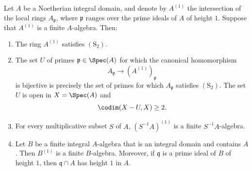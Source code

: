 \begin{proposition}[5.10.17]
\label{IV.5.10.17}
Let $A$ be a Noetherian integral domain, and denote by $A^{(1)}$
the intersection of the local rings $A_{\mathfrak p}$, where
$\mathfrak p$ ranges over the prime ideals of $A$ of height $1$.
Suppose that $A^{(1)}$ is a finite $A$-algebra.  Then:
\begin{enumerate}[{\rm(i)}]
  \item The ring $A^{(1)}$ satisfies $(\mathrm S_2)$.
  \item The set $U$ of primes $\mathfrak p\in\Spec(A)$ for which
  the canonical homomorphism
  \[
    A_{\mathfrak p}\longrightarrow(A^{(1)})_{\mathfrak p}
  \]
  is bijective is precisely the set of primes for which
  $A_{\mathfrak p}$ satisfies $(\mathrm S_2)$.  The set $U$ is
  open in $X=\Spec(A)$ and
  \[
    \codim(X-U,X)\geq2.
  \]
  \item For every multiplicative subset $S$ of $A$,
  $(S^{-1}A)^{(1)}$ is a finite $S^{-1}A$-algebra.
  \item Let $B$ be a finite integral $A$-algebra that is an
  integral domain and contains $A$.  Then $B^{(1)}$ is a finite
  $B$-algebra.  Moreover, if $\mathfrak q$ is a prime ideal of
  $B$ of height $1$, then $\mathfrak q\cap A$ has height $1$ in
  $A$.
\end{enumerate}
\end{proposition}

